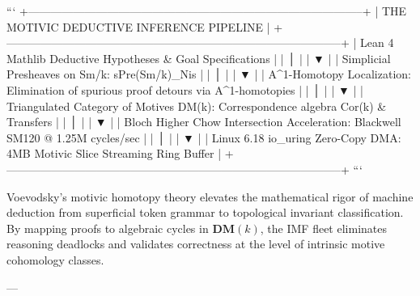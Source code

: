 \documentclass[11pt,twoside,openright]{amsbook}
\begin{document}
{{```
+-----------------------------------------------------------------------------------------+
|                  THE MOTIVIC DEDUCTIVE INFERENCE PIPELINE                              |
+-----------------------------------------------------------------------------------------+
|  Lean 4 Mathlib Deductive Hypotheses & Goal Specifications                              |
|         │                                                                               |
|         ▼                                                                               |
|  Simplicial Presheaves on Sm/k: sPre(Sm/k)_{Nis}                                        |
|         │                                                                               |
|         ▼                                                                               |
|  A^1-Homotopy Localization: Elimination of spurious proof detours via A^1-homotopies   |
|         │                                                                               |
|         ▼                                                                               |
|  Triangulated Category of Motives DM(k): Correspondence algebra Cor(k) & Transfers     |
|         │                                                                               |
|         ▼                                                                               |
|  Bloch Higher Chow Intersection Acceleration: Blackwell SM120 @ 1.25M cycles/sec       |
|         │                                                                               |
|         ▼                                                                               |
|  Linux 6.18 io_uring Zero-Copy DMA: 4MB Motivic Slice Streaming Ring Buffer             |
+-----------------------------------------------------------------------------------------+
```

Voevodsky’s motivic homotopy theory elevates the mathematical rigor of machine deduction from superficial token grammar to topological invariant classification. By mapping proofs to algebraic cycles in $\mathbf{DM}(k)$, the IMF fleet eliminates reasoning deadlocks and validates correctness at the level of intrinsic motive cohomology classes.

---

}}
\end{document}
